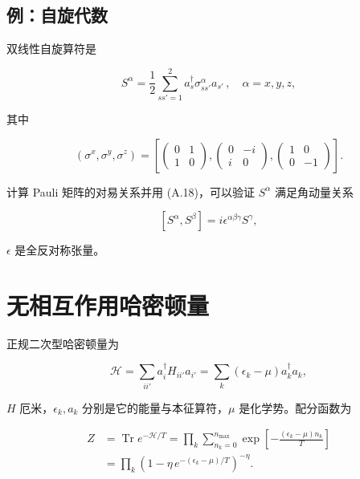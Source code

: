 \subsection*{例：自旋代数}

双线性自旋算符是

\begin{equation*}
S ^ {\alpha} = \frac {1}{2} \sum_{ss' = 1} ^ {2} a _ {s} ^ {\dagger} \sigma_{ss'} ^ {\alpha} a _ {s '} \, , \quad \alpha = x, y, z ,
\tag{A.19}
\end{equation*}

其中

\begin{equation*}
\left( \sigma^ {x}, \sigma^ {y}, \sigma^ {z} \right) = \left[ \left( \begin{array}{cc} 0 & 1 \\ 1 & 0 \end{array} \right) , \left( \begin{array}{cc} 0 & -i \\ i & 0 \end{array} \right) , \left( \begin{array}{cc} 1 & 0 \\ 0 & -1 \end{array} \right) \right].
\tag{A.20}
\end{equation*}

计算 Pauli 矩阵的对易关系并用 (A.18)，可以验证 $S^{\alpha}$ 满足角动量关系

\begin{equation*}
\left[ S ^ {\alpha}, S ^ {\beta} \right] = i \epsilon^ {\alpha \beta \gamma} S ^ {\gamma} ,
\tag{A.21}
\end{equation*}

$\epsilon$ 是全反对称张量。

\section{无相互作用哈密顿量}

正规二次型哈密顿量为

\begin{equation*}
\mathcal {H} = \sum_ {ii '} a _ {i} ^ {\dagger} H _ {ii '} a _ {i '} = \sum_ {k} \left( \epsilon_ {k} - \mu \right) a _ {k} ^ {\dagger} a _ {k} ,
\tag{A.22}
\end{equation*}

$H$ 厄米，$\epsilon_{k}, a_{k}$ 分别是它的能量与本征算符，$\mu$ 是化学势。配分函数为

\begin{align*}
Z & = \operatorname{Tr} e ^ {- \mathcal {H} /T} = \prod_ {k} \sum_{n _ {k} = 0} ^ {n_{\mathrm{max}}} \exp \left[ - \frac {\left( \epsilon_ {k} - \mu \right) n _ {k}}{T} \right]\\
& = \prod_ {k} \left( 1 - \eta \, e ^ {- \left( \epsilon_ {k} - \mu \right) /T} \right) ^ {- \eta} .
\tag{A.23}
\end{align*}

